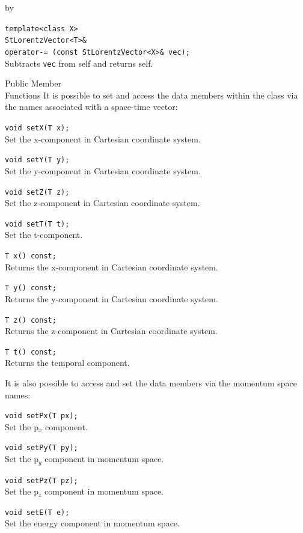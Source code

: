 \documentclass[twoside]{article}
\newcommand{\comp}[1]{\texttt{#1}}%
\newcommand{\entrylabel}[1]{\mbox{\textbf{{#1}}}\hfil}%
\newenvironment{entry}
{\begin{list}{}%
    {\renewcommand{\makelabel}{\entrylabel}%
     \setlength{\labelwidth}{90pt}%
     \setlength{\leftmargin}{\labelwidth}
     \advance\leftmargin by \labelsep%
      }%
    }%
  {\end{list}}
\newcommand{\Entrylabel}[1]%
{\raisebox{0pt}[1ex][0pt]{\makebox[\labelwidth][l]%
    {\parbox[t]{\labelwidth}{\hspace{0pt}\textbf{{#1}}}}}}
\newenvironment{Entry}%
{\renewcommand{\entrylabel}{\Entrylabel}\begin{entry}}%
  {\end{entry}}
\begin{document}
\begin{description}
\begin{Entry}
    \verb+template<class X>+\\
    \verb+StLorentzVector<T>&+\\
    \verb+operator-= (const StLorentzVector<X>& vec);+\\
    Subtracts \comp{vec} from self and returns self.
    
\item[Public Member\\ Functions]
  It is possible to set and access the data members within the class
  via the names associated with a space-time vector:
  
    \verb+void setX(T x);+\\
    Set the x-component in Cartesian coordinate system.
    
    \verb+void setY(T y);+\\
    Set the y-component in Cartesian coordinate system.
    
    \verb+void setZ(T z);+\\
    Set the z-component in Cartesian coordinate system.
    
    \verb+void setT(T t);+\\
    Set the t-component.

    \verb+T x() const;+\\
    Returns the x-component in Cartesian coordinate system.
    
    \verb+T y() const;+\\
    Returns the y-component in Cartesian coordinate system.
    
    \verb+T z() const;+\\
    Returns the z-component in Cartesian coordinate system.

    \verb+T t() const;+\\
    Returns the temporal component.
    
    It is also possible to access and set the data members
    via the momentum space names:  
    
    \verb+void setPx(T px);+\\
    Set the p$_{x}$ component.
        
    \verb+void setPy(T py);+\\
    Set the p$_{y}$ component in momentum space.
    
    \verb+void setPz(T pz);+\\
    Set the p$_{z}$ component in momentum space.
    
    \verb+void setE(T e);+\\
    Set the energy component in momentum space.


\end{Entry}
\end{description}
\end{document}
